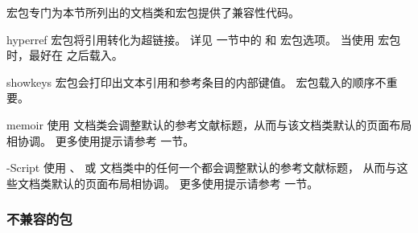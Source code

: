 \biblatex 宏包专门为本节所列出的文档类和宏包提供了兼容性代码。

\begin{marglist}

\item[hyperref]
 宏包将引用转化为超链接。
详见   一节中的  和  宏包选项。
当使用  宏包时，最好在 \biblatex 之后载入。

\item[showkeys]
 宏包会打印出文本引用和参考条目的内部键值。
宏包载入的顺序不重要。

\item[memoir]
使用  文档类会调整默认的参考文献标题，从而与该文档类默认的页面布局相协调。
更多使用提示请参考  一节。

\item[\acr{KOMA}-Script]
使用 、 或  文档类中的任何一个都会调整默认的参考文献标题，
从而与这些文档类默认的页面布局相协调。
更多使用提示请参考  一节。
\end{marglist}

\subsubsection{不兼容的包}
\label{int:pre:inc}


